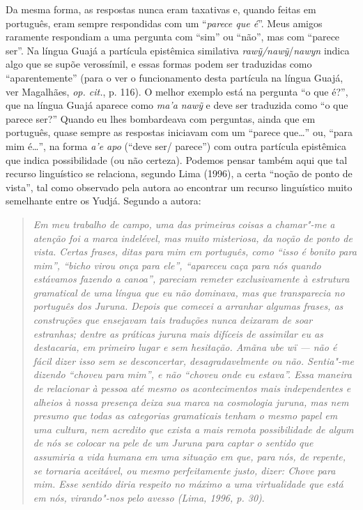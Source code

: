 Da mesma forma, as respostas nunca eram taxativas e, quando feitas em
português, eram sempre respondidas com um ``\emph{parece que é}''. Meus
amigos raramente respondiam a uma pergunta com ``sim'' ou ``não'', mas com
``parece ser''. Na língua Guajá a partícula epistêmica similativa
\emph{rawỹ/nawỹ}/\emph{nawyn} indica algo que se supõe verossímil, e
essas formas podem ser traduzidas como ``aparentemente'' (para o ver o
funcionamento desta partícula na língua Guajá, ver Magalhães, \emph{op. cit.},
p. 116). O melhor exemplo está na pergunta ``o que é?'', que na língua
Guajá aparece como \emph{ma'a nawỹ} e deve ser traduzida como ``o que
parece ser?'' Quando eu lhes bombardeava com perguntas, ainda que em
português, quase sempre as respostas iniciavam com um ``parece que\ldots{}''
ou, ``para mim é\ldots{}'', na forma \emph{a'e apo} (``deve ser/ parece'') com
outra partícula epistêmica que indica possibilidade (ou não certeza).
Podemos pensar também aqui que tal recurso linguístico se relaciona,
segundo Lima (1996), a certa ``noção de ponto de vista'', tal como
observado pela autora ao encontrar um recurso linguístico muito
semelhante entre os Yudjá. Segundo a autora:

\begin{quote}
\emph{Em meu trabalho de campo, uma das primeiras coisas a chamar"-me a atenção
foi a marca indelével, mas muito misteriosa, da noção de ponto de vista.
Certas frases, ditas para mim em português, como ``isso é bonito para
mim'', ``bicho virou onça para ele'', ``apareceu caça para nós quando
estávamos fazendo a canoa'', pareciam remeter exclusivamente à estrutura
gramatical de uma língua que eu não dominava, mas que transparecia no
português dos Juruna. Depois que comecei a arranhar algumas frases, as
construções que ensejavam tais traduções nunca deixaram de soar
estranhas; dentre as práticas juruna mais difíceis de assimilar eu as
destacaria, em primeiro lugar e sem hesitação. \emph{Amãna ube wï} ---
não é fácil dizer isso sem se desconcertar, desagradavelmente ou não.
Sentia"-me dizendo ``choveu para mim'', e não ``choveu onde eu estava''.
Essa maneira de relacionar à pessoa até mesmo os acontecimentos mais
independentes e alheios à nossa presença deixa sua marca na cosmologia
juruna, mas nem presumo que todas as categorias gramaticais tenham o
mesmo papel em uma cultura, nem acredito que exista a mais remota
possibilidade de algum de nós se colocar na pele de um Juruna para
captar o sentido que assumiria a vida humana em uma situação em que,
para nós, de repente, se tornaria aceitável, ou mesmo perfeitamente
justo, dizer: Chove para mim. Esse sentido diria respeito no máximo a
uma virtualidade que está em nós, virando"-nos pelo avesso (Lima, 1996,
p. 30)}.
\end{quote}

